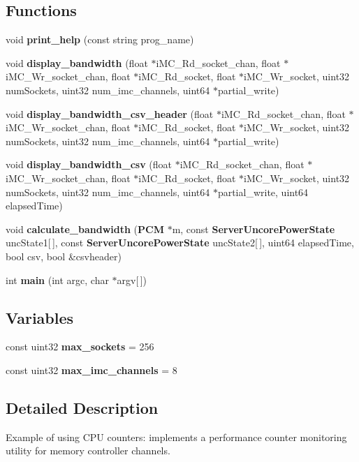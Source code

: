 \subsection*{Functions}
\begin{DoxyCompactItemize}
\item 
void {\bfseries print\+\_\+help} (const string prog\+\_\+name)\label{pcm-memory_8cpp_aed15bac2c898efcc1f005764539f7970}

\item 
void {\bfseries display\+\_\+bandwidth} (float $\ast$i\+M\+C\+\_\+\+Rd\+\_\+socket\+\_\+chan, float $\ast$i\+M\+C\+\_\+\+Wr\+\_\+socket\+\_\+chan, float $\ast$i\+M\+C\+\_\+\+Rd\+\_\+socket, float $\ast$i\+M\+C\+\_\+\+Wr\+\_\+socket, uint32 num\+Sockets, uint32 num\+\_\+imc\+\_\+channels, uint64 $\ast$partial\+\_\+write)\label{pcm-memory_8cpp_a398f5895935bca2e764035e743ad80a7}

\item 
void {\bfseries display\+\_\+bandwidth\+\_\+csv\+\_\+header} (float $\ast$i\+M\+C\+\_\+\+Rd\+\_\+socket\+\_\+chan, float $\ast$i\+M\+C\+\_\+\+Wr\+\_\+socket\+\_\+chan, float $\ast$i\+M\+C\+\_\+\+Rd\+\_\+socket, float $\ast$i\+M\+C\+\_\+\+Wr\+\_\+socket, uint32 num\+Sockets, uint32 num\+\_\+imc\+\_\+channels, uint64 $\ast$partial\+\_\+write)\label{pcm-memory_8cpp_aef2c828b337ba7e39a88ae128da716dc}

\item 
void {\bfseries display\+\_\+bandwidth\+\_\+csv} (float $\ast$i\+M\+C\+\_\+\+Rd\+\_\+socket\+\_\+chan, float $\ast$i\+M\+C\+\_\+\+Wr\+\_\+socket\+\_\+chan, float $\ast$i\+M\+C\+\_\+\+Rd\+\_\+socket, float $\ast$i\+M\+C\+\_\+\+Wr\+\_\+socket, uint32 num\+Sockets, uint32 num\+\_\+imc\+\_\+channels, uint64 $\ast$partial\+\_\+write, uint64 elapsed\+Time)\label{pcm-memory_8cpp_a84a562a9664aede8e37b04407a7fe858}

\item 
void {\bfseries calculate\+\_\+bandwidth} ({\bf P\+C\+M} $\ast$m, const {\bf Server\+Uncore\+Power\+State} unc\+State1[$\,$], const {\bf Server\+Uncore\+Power\+State} unc\+State2[$\,$], uint64 elapsed\+Time, bool csv, bool \&csvheader)\label{pcm-memory_8cpp_ae0fa633691c381cdccf0807f0949ebcb}

\item 
int {\bfseries main} (int argc, char $\ast$argv[$\,$])\label{pcm-memory_8cpp_a0ddf1224851353fc92bfbff6f499fa97}

\end{DoxyCompactItemize}
\subsection*{Variables}
\begin{DoxyCompactItemize}
\item 
const uint32 {\bfseries max\+\_\+sockets} = 256\label{pcm-memory_8cpp_a7ef99323bd02eadd1f92faf654a892be}

\item 
const uint32 {\bfseries max\+\_\+imc\+\_\+channels} = 8\label{pcm-memory_8cpp_a2722bd2db68b8fa831786ce704a82bbb}

\end{DoxyCompactItemize}


\subsection{Detailed Description}
Example of using C\+P\+U counters\+: implements a performance counter monitoring utility for memory controller channels. 


